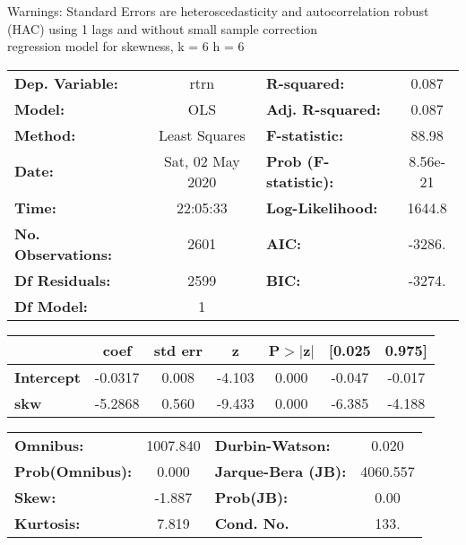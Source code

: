 Warnings: \newline
 [1] Standard Errors are heteroscedasticity and autocorrelation robust (HAC) using 1 lags and without small sample correction\\ 

regression model for skewness, k = 6 h = 6\begin{center}
\begin{tabular}{lclc}
\toprule
\textbf{Dep. Variable:}    &       rtrn       & \textbf{  R-squared:         } &     0.087   \\
\textbf{Model:}            &       OLS        & \textbf{  Adj. R-squared:    } &     0.087   \\
\textbf{Method:}           &  Least Squares   & \textbf{  F-statistic:       } &     88.98   \\
\textbf{Date:}             & Sat, 02 May 2020 & \textbf{  Prob (F-statistic):} &  8.56e-21   \\
\textbf{Time:}             &     22:05:33     & \textbf{  Log-Likelihood:    } &    1644.8   \\
\textbf{No. Observations:} &        2601      & \textbf{  AIC:               } &    -3286.   \\
\textbf{Df Residuals:}     &        2599      & \textbf{  BIC:               } &    -3274.   \\
\textbf{Df Model:}         &           1      & \textbf{                     } &             \\
\bottomrule
\end{tabular}
\begin{tabular}{lcccccc}
                   & \textbf{coef} & \textbf{std err} & \textbf{z} & \textbf{P$> |$z$|$} & \textbf{[0.025} & \textbf{0.975]}  \\
\midrule
\textbf{Intercept} &      -0.0317  &        0.008     &    -4.103  &         0.000        &       -0.047    &       -0.017     \\
\textbf{skw}       &      -5.2868  &        0.560     &    -9.433  &         0.000        &       -6.385    &       -4.188     \\
\bottomrule
\end{tabular}
\begin{tabular}{lclc}
\textbf{Omnibus:}       & 1007.840 & \textbf{  Durbin-Watson:     } &    0.020  \\
\textbf{Prob(Omnibus):} &   0.000  & \textbf{  Jarque-Bera (JB):  } & 4060.557  \\
\textbf{Skew:}          &  -1.887  & \textbf{  Prob(JB):          } &     0.00  \\
\textbf{Kurtosis:}      &   7.819  & \textbf{  Cond. No.          } &     133.  \\
\bottomrule
\end{tabular}
\end{center}

